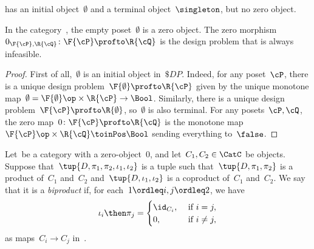 \begin{example}
    \Pos has an initial object~$\emptyset$ and a terminal object~$\singleton$, but no zero object.
\end{example}

\begin{lemma}
    In the category~\DP, the empty poset~$\emptyset$ is a zero object. The zero morphism~$0_{\F{\cP},\R{\cQ}}\colon \F{\cP} \profto \R{\cQ}$ is the design problem that is always infeasible.
\end{lemma}
\begin{proof}
    First of all,~$\emptyset$ is an initial object in~$\$DP$. Indeed, for any poset~$\cP $, there is a unique design problem~$\F{\emptyset} \profto \R{\cP}$ given by the unique monotone map~$\emptyset=\F{\emptyset}\op\times \R{\cP} \to\Bool$. Similarly, there is a unique design problem~$\F{\cP} \profto \R{\emptyset}$, so~$\emptyset$ is also terminal. For any posets~$\cP ,\cQ$, the zero map~$0 \colon \F{\cP} \profto \R{\cQ}$ is the monotone map~$\F{\cP} \op\times \R{\cQ} \toinPos \Bool$ sending everything to~$\false$.
\end{proof}

\begin{ctdefinition}[Biproduct]
    Let~\CatC be a category with a zero-object~$0$, and let~$C_1,C_2\in\CatC$ be objects. Suppose that~$\tup{D,\pi_1,\pi_2,\iota_1,\iota_2}$ is a tuple such that~$\tup{D,\pi_1,\pi_2}$ is a product of~$C_1$ and~$C_2$ and~$\tup{D,\iota_1,\iota_2}$ is a coproduct of~$C_1$ and~$C_2$. We say that it is a \emph{biproduct} if, for each~$1\ordleq i,j\ordleq 2$, we have
    \begin{equation}
        \iota_i\then \pi_j=
        \begin{cases}
            \id_{C_i}, &\text{ if }i=j,\\
            0, &\text{ if }i\neq j,
        \end{cases} \label{eq:biproduct-condition}
    \end{equation}
    as maps~$C_i\to C_j$ in~\CatC.
\end{ctdefinition}

